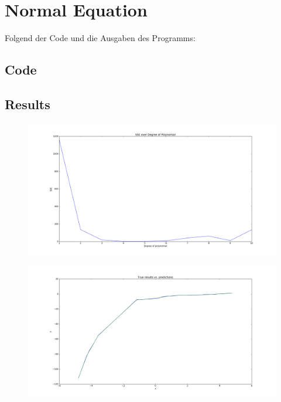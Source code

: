 \documentclass{article}
\begin{document}
\section{Normal Equation}
Folgend der Code und die Ausgaben des Programms:

\subsection{Code}

\subsection{Results}
\begin{figure}[h]
    \centering
    \includegraphics[width=\textwidth]{SSE.png}
\end{figure}
\begin{figure}[h]
    \centering
    \includegraphics[width=\textwidth]{RESULTS.png}
\end{figure}
\end{document}
